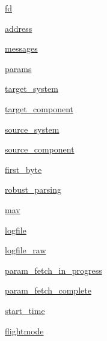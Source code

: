 \begin{DoxyCompactItemize}
\item 
\mbox{\hyperlink{classpymavlink_1_1mavutil_1_1mavfile_a157775ad737f937ae736cbf039f367aa}{fd}}
\item 
\mbox{\hyperlink{classpymavlink_1_1mavutil_1_1mavfile_a3307e42a1f2ad53909dca6f9a232760c}{address}}
\item 
\mbox{\hyperlink{classpymavlink_1_1mavutil_1_1mavfile_a7521a5e9786057266e9bc3bdafb058d0}{messages}}
\item 
\mbox{\hyperlink{classpymavlink_1_1mavutil_1_1mavfile_a1a1f44b89b1ac41484cfd88f83b7c695}{params}}
\item 
\mbox{\hyperlink{classpymavlink_1_1mavutil_1_1mavfile_afb3bf96157b342b89a4279edb3f90239}{target\+\_\+system}}
\item 
\mbox{\hyperlink{classpymavlink_1_1mavutil_1_1mavfile_a2b8ac037d02bd5e90792e6c420549bb9}{target\+\_\+component}}
\item 
\mbox{\hyperlink{classpymavlink_1_1mavutil_1_1mavfile_a02c06667c79f4414ed9c4ee6a8dec903}{source\+\_\+system}}
\item 
\mbox{\hyperlink{classpymavlink_1_1mavutil_1_1mavfile_a84e307f771a9ac2aed567831845c417e}{source\+\_\+component}}
\item 
\mbox{\hyperlink{classpymavlink_1_1mavutil_1_1mavfile_a2585c4bd855d86eb033e4d5fb8405289}{first\+\_\+byte}}
\item 
\mbox{\hyperlink{classpymavlink_1_1mavutil_1_1mavfile_ac662327c5d9bd4fca595ff6bc97fd587}{robust\+\_\+parsing}}
\item 
\mbox{\hyperlink{classpymavlink_1_1mavutil_1_1mavfile_aecb6ecfdc61f1c69fc0d15fcdef436b0}{mav}}
\item 
\mbox{\hyperlink{classpymavlink_1_1mavutil_1_1mavfile_a173adae978d36daed8740caaf561200d}{logfile}}
\item 
\mbox{\hyperlink{classpymavlink_1_1mavutil_1_1mavfile_a369ec548641670e6551050aa82438050}{logfile\+\_\+raw}}
\item 
\mbox{\hyperlink{classpymavlink_1_1mavutil_1_1mavfile_a94754e789681df30204171076fdcee9e}{param\+\_\+fetch\+\_\+in\+\_\+progress}}
\item 
\mbox{\hyperlink{classpymavlink_1_1mavutil_1_1mavfile_a9580276155bfccf280bf8063157ed216}{param\+\_\+fetch\+\_\+complete}}
\item 
\mbox{\hyperlink{classpymavlink_1_1mavutil_1_1mavfile_a60156edac1dab0be5df8c111e5b32910}{start\+\_\+time}}
\item 
\mbox{\hyperlink{classpymavlink_1_1mavutil_1_1mavfile_a41a8e74171d6a02c354e6b20e27d8922}{flightmode}}

\end{DoxyCompactItemize}
